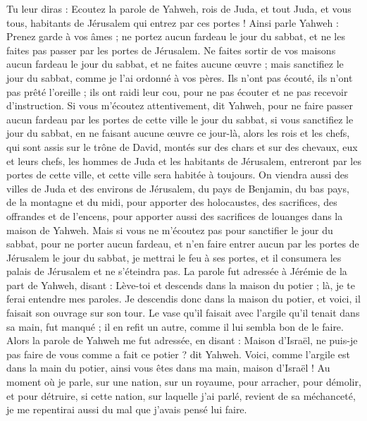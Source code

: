 \begin{multicols}{2}
Tu leur diras : Ecoutez la parole de Yahweh, rois de Juda, et tout Juda, et vous tous, habitants de Jérusalem qui entrez par ces portes !
Ainsi parle Yahweh : Prenez garde à vos âmes ; ne portez aucun fardeau le jour du sabbat, et ne les faites pas passer par les portes de Jérusalem.
Ne faites sortir de vos maisons aucun fardeau le jour du sabbat, et ne faites aucune œuvre ; mais sanctifiez le jour du sabbat, comme je l'ai ordonné à vos pères.
Ils n'ont pas écouté, ils n'ont pas prêté l’oreille ; ils ont raidi leur cou, pour ne pas écouter et ne pas recevoir d'instruction.
Si vous m'écoutez attentivement, dit Yahweh, pour ne faire passer aucun fardeau par les portes de cette ville le jour du sabbat, si vous sanctifiez le jour du sabbat, en ne faisant aucune œuvre ce jour-là,
alors les rois et les chefs, qui sont assis sur le trône de David, montés sur des chars et sur des chevaux, eux et leurs chefs, les hommes de Juda et les habitants de Jérusalem, entreront par les portes de cette ville, et cette ville sera habitée à toujours.
On viendra aussi des villes de Juda et des environs de Jérusalem, du pays de Benjamin, du bas pays, de la montagne et du midi, pour apporter des holocaustes, des sacrifices, des offrandes et de l'encens, pour apporter aussi des sacrifices de louanges dans la maison de Yahweh.
Mais si vous ne m'écoutez pas pour sanctifier le jour du sabbat, pour ne porter aucun fardeau, et n'en faire entrer aucun par les portes de Jérusalem le jour du sabbat, je mettrai le feu à ses portes, et il consumera les palais de Jérusalem et ne s’éteindra pas.
\VerseOne{}La parole fut adressée à Jérémie de la part de Yahweh, disant :
Lève-toi et descends dans la maison du potier ; là, je te ferai entendre mes paroles.
Je descendis donc dans la maison du potier, et voici, il faisait son ouvrage sur son tour.
Le vase qu'il faisait avec l'argile qu’il tenait dans sa main, fut manqué ; il en refit un autre, comme il lui sembla bon de le faire.
Alors la parole de Yahweh me fut adressée, en disant :
Maison d'Israël, ne puis-je pas faire de vous comme a fait ce potier ? dit Yahweh. Voici, comme l'argile est dans la main du potier, ainsi vous êtes dans ma main, maison d'Israël !
Au moment où je parle, sur une nation, sur un royaume, pour arracher, pour démolir, et pour détruire,
si cette nation, sur laquelle j'ai parlé, revient de sa méchanceté, je me repentirai aussi du mal que j'avais pensé lui faire.

\end{multicols}
